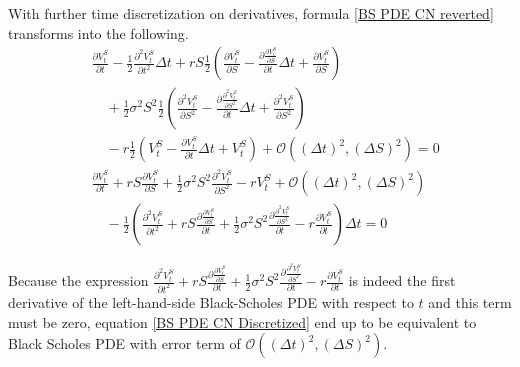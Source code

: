 \documentclass{article}
\begin{document}
With further time discretization on derivatives, formula \ref{BS PDE CN reverted} transforms into the following.
\begin{align}
    & \frac{\partial V_{t}^{S}}{\partial t} - \frac{1}{2} \frac{\partial^2 V_{t}^{S}}{\partial t^2} \Delta t + r S \frac{1}{2} \left(\frac{\partial V_{t}^{S}}{\partial S} - \frac{\partial \frac{\partial V_{t}^{S}}{\partial S}}{\partial t} \Delta t + \frac{\partial V_{t}^{S}}{\partial S}\right) \nonumber \\
    & \quad + \frac{1}{2} \sigma^2 S^2 \frac{1}{2} \left(\frac{\partial^2 V_{t}^{S}}{\partial S^2} - \frac{\partial \frac{\partial^2 V_{t}^{S}}{\partial S^2}}{\partial t} \Delta t + \frac{\partial^2 V_{t}^{S}}{\partial S^2}\right) \nonumber \\
    & \quad -r \frac{1}{2} \left(V_{t}^{S} - \frac{\partial V_{t}^{S}}{\partial t} \Delta t + V_{t}^{S}\right) + \mathcal{O}\left(\left(\Delta t\right)^2, \left(\Delta S\right)^2\right) = 0 \nonumber \\
    & \frac{\partial V_{t}^{S}}{\partial t} + r S \frac{\partial V_{t}^{S}}{\partial S} + \frac{1}{2} \sigma^2 S^2 \frac{\partial^2 V_{t}^{S}}{\partial S^2} -r V_{t}^{S} + \mathcal{O}\left(\left(\Delta t\right)^2, \left(\Delta S\right)^2\right) \nonumber \\
    & \quad - \frac{1}{2} \left(\frac{\partial^2 V_{t}^{S}}{\partial t^2} + r S \frac{\partial \frac{\partial V_{t}^{S}}{\partial S}}{\partial t} + \frac{1}{2} \sigma^2 S^2 \frac{\partial \frac{\partial^2 V_{t}^{S}}{\partial S^2}}{\partial t} - r \frac{\partial V_{t}^{S}}{\partial t} \right) \Delta t = 0 \label{BS PDE CN reverted 2}
\end{align}

Because the expression $ \frac{\partial^2 V_{t}^{S}}{\partial t^2} + r S \frac{\partial \frac{\partial V_{t}^{S}}{\partial S}}{\partial t} + \frac{1}{2} \sigma^2 S^2 \frac{\partial \frac{\partial^2 V_{t}^{S}}{\partial S^2}}{\partial t} - r \frac{\partial V_{t}^{S}}{\partial t} $ is indeed the first derivative of the left-hand-side Black-Scholes PDE with respect to $ t $ and this term must be zero, equation \ref{BS PDE CN Discretized} end up to be equivalent to Black Scholes PDE with error term of $ \mathcal{O}\left(\left(\Delta t\right)^2, \left(\Delta S\right)^2\right) $.
\end{document}

